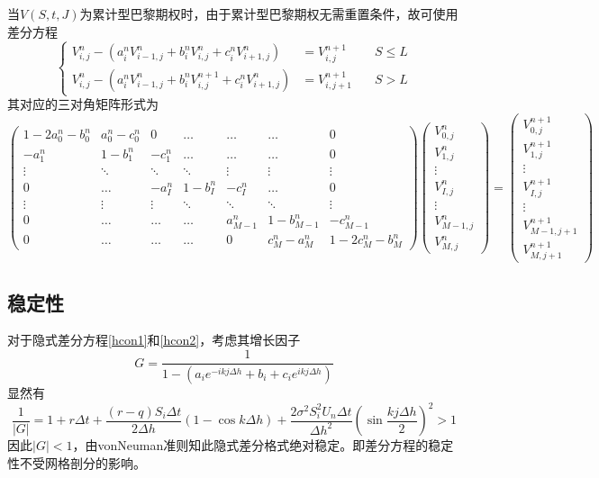 \documentclass{ctexart} %
\begin{document}
当$V(S,t,J)$为累计型巴黎期权时，由于累计型巴黎期权无需重置条件，故可使用差分方程
\begin{equation}
\label{hcmu}
\left\{
\begin{aligned}
V^n_{i,j}-(a^n_iV^{n}_{i-1,j}+b^n_iV^{n}_{i,j}+c^n_iV^{n}_{i+1,j})&=V^{n+1}_{i,j} \quad &S\leq L \\
V^n_{i,j}-(a^n_iV^{n}_{i-1,j}+b^n_iV^{n+1}_{i,j}+c^n_iV^{n}_{i+1,j})&=V^{n+1}_{i,j+1} \quad &S > L 
\end{aligned}
\right.
\end{equation}
其对应的三对角矩阵形式为
\begin{equation}
\left(
\begin{matrix}
1-2a^n_0-b^n_0 & a^n_0-c^n_0 & 0       &\ldots  & \ldots &\ldots     & 0 \\
-a^n_1       & 1-b^n_1   & -c^n_1    &\ldots  & \ldots &\ldots     & 0       \\
\vdots     & \ddots  & \ddots  &\ddots  & \vdots & \vdots   & \vdots   \\
0          & \ldots  & -a^n_I    & 1-b^n_I  & -c^n_I    & \ldots  & 0    \\
\vdots     & \vdots  & \vdots  &\ddots  & \ddots & \ddots   & \vdots   \\
0          & \ldots  & \ldots  &\ldots  & a^n_{M-1} & 1-b^n_{M-1} & -c^n_{M-1}   \\
0          & \ldots  & \ldots  &\ldots  &0        & c^n_M-a^n_M & 1-2c^n_M-b^n_M      
\end{matrix}
\right)
\left(
\begin{matrix}
V_{0,j}^n\\
V_{1,j}^n\\
\vdots\\
V_{I,j}^n\\
\vdots\\
V_{M-1,j}^n\\
V_{M,j}^n
\end{matrix}
\right)
=
\left(
\begin{matrix}
V_{0,j}^{n+1}\\
V_{1,j}^{n+1}\\
\vdots\\
V_{I,j}^{n+1}\\
\vdots\\
V_{M-1,j+1}^{n+1}\\
V_{M,j+1}^{n+1}
\end{matrix}
\right)
\end{equation}
\subsection{稳定性}
对于隐式差分方程\eqref{hcon1}和\eqref{hcon2}，考虑其增长因子
\begin{equation}
G=\frac{1}{1-(a_ie^{-ikj\Delta h}+b_i+c_ie^{ikj\Delta h})}
\end{equation}
显然有
\begin{equation}
\frac{1}{|G|}=1+r\Delta t+\frac{(r-q)S_i\Delta t}{2\Delta h}(1-\cos k\Delta h)+\frac{2\sigma^2S_i^2U_{n}\Delta t}{\Delta h^2}(\sin\frac{kj\Delta h}{2})^2>1
\end{equation}
因此$|G|<1$，由vonNeuman准则知此隐式差分格式绝对稳定。即差分方程的稳定性不受网格剖分的影响。
\end{document}
